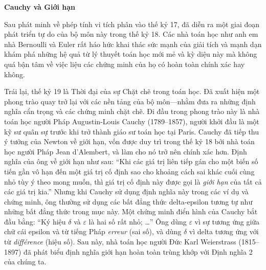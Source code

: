 \noindent
\begin{minipage}[t]{0.28\textwidth}
    \vspace{0pt}
    \vspace{6pt}
    \begin{tcolorbox}[
        colback=white,
        colframe=stewartgreen,
        arc=0mm,
        boxrule=1pt,
        left=6pt,
        right=6pt,
        top=7pt,
        bottom=7pt,
        boxsep=0pt
    ]
    {\fontsize{10pt}{12.5pt}\selectfont\textbf{\textsf{\color{stewartgreen}Cauchy và Giới hạn}}}\par\vspace{5pt}
    {\fontsize{7.9pt}{10.8pt}\selectfont
    Sau phát minh về phép tính vi tích phân vào thế kỷ 17, đã diễn ra một giai đoạn phát triển tự do của bộ môn này trong thế kỷ 18. Các nhà toán học như anh em nhà Bernoulli và Euler rất háo hức khai thác sức mạnh của giải tích và mạnh dạn khám phá những hệ quả từ lý thuyết toán học mới mẻ và kỳ diệu này mà không quá bận tâm về việc liệu các chứng minh của họ có hoàn toàn chính xác hay không.\par\vspace{5pt}
    Trái lại, thế kỷ 19 là Thời đại của sự Chặt chẽ trong toán học. Đã xuất hiện một phong trào quay trở lại với các nền tảng của bộ môn—nhằm đưa ra những định nghĩa cẩn trọng và các chứng minh chặt chẽ. Đi đầu trong phong trào này là nhà toán học người Pháp Augustin-Louis Cauchy (1789--1857), người khởi đầu là một kỹ sư quân sự trước khi trở thành giáo sư toán học tại Paris. Cauchy đã tiếp thu ý tưởng của Newton về giới hạn, vốn được duy trì trong thế kỷ 18 bởi nhà toán học người Pháp Jean d'Alembert, và làm cho nó trở nên chính xác hơn. Định nghĩa của ông về giới hạn như sau: ``Khi các giá trị liên tiếp gán cho một biến số tiến gần vô hạn đến một giá trị cố định sao cho khoảng cách sai khác cuối cùng nhỏ tùy ý theo mong muốn, thì giá trị cố định này được gọi là \textit{giới hạn} của tất cả các giá trị kia.'' Nhưng khi Cauchy sử dụng định nghĩa này trong các ví dụ và chứng minh, ông thường sử dụng các bất đẳng thức delta-epsilon tương tự như những bất đẳng thức trong mục này. Một chứng minh điển hình của Cauchy bắt đầu bằng: ``Ký hiệu $\delta$ và $\varepsilon$ là hai số rất nhỏ; \dots'' Ông dùng $\varepsilon$ vì sự tương ứng giữa chữ cái epsilon và từ tiếng Pháp \textit{erreur} (sai số), và dùng $\delta$ vì delta tương ứng với từ \textit{différence} (hiệu số). Sau này, nhà toán học người Đức Karl Weierstrass (1815--1897) đã phát biểu định nghĩa giới hạn hoàn toàn trùng khớp với Định nghĩa 2 của chúng ta.\par}
    \end{tcolorbox}
\end{minipage}%
